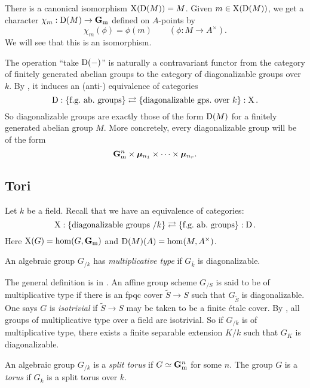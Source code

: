 There is a canonical isomorphism $\operatorname{X}(\operatorname{D}(M))=M$. Given 
$m\in \operatorname{X}(\operatorname{D}(M))$, we get a character $\chi_m:\operatorname{D}(M)\to\mathbf{G}_\mathrm{m}$ 
defined on $A$-points by 
\[
  \chi_m(\phi) = \phi(m) \qquad (\phi:M\to A^\times) .
\]
We will see that this is an isomorphism. 

The operation ``take $\operatorname{D}(-)$'' is naturally a contravariant functor from the 
category of finitely generated abelian groups to the category of diagonalizable 
groups over $k$. By \cite[VIII 1.6]{sga3-ii}, it induces an (anti-) equivalence 
of categories 
\[
  \operatorname{D}:\{\text{f.g.~ab.~groups}\} \rightleftarrows \{\text{diagonalizable gps.~over $k$}\}: \operatorname{X} .
\]
So diagonalizable groups are exactly those of the form 
$\operatorname{D}(M)$ for a finitely generated abelian group $M$. More concretely, every 
diagonalizable group will be of the form 
\[
  \mathbf{G}_\mathrm{m}^n \times \bm{\mu}_{n_1} \times \cdots \times \bm{\mu}_{n_r} .
\]





\subsection{Tori}

Let $k$ be a field. Recall that we have an equivalence of categories: 
\[
  \operatorname{X}:\{\text{diagonalizable groups }/k\} \rightleftarrows \{\text{f.g.~ab.~groups}\}:\operatorname{D} .
\]
Here $\operatorname{X}(G)=\hom(G,\mathbf{G}_\mathrm{m})$ and $\operatorname{D}(M)(A)=\hom(M,A^\times)$. 

\begin{definition}
An algebraic group $G_{/k}$ has \emph{multiplicative type} if $G_{\bar k}$ is 
diagonalizable. 
\end{definition}

\begin{hard}
The general definition is in \cite[IX 1.1]{sga3-iii}. An affine group scheme 
$G_{/S}$ is said to be of multiplicative type if there is an fpqc cover 
$\widetilde S\to S$ such that $G_{\widetilde S}$ is diagonalizable. One says 
$G$ is \emph{isotrivial} if $\widetilde S\to S$ may be taken to be a finite 
\'etale cover. By \cite[X 5.16]{sga3-ii}, all groups of multiplicative type 
over a field are isotrivial. So if $G_{/k}$ is of multiplicative type, there 
exists a finite separable extension $K/k$ such that $G_K$ is diagonalizable. 
\end{hard}

\begin{definition}
An algebraic group $G_{/k}$ is a \emph{split torus} if 
$G\simeq \mathbf{G}_\mathrm{m}^n$ for some $n$. The group $G$ is a \emph{torus} if 
$G_{\bar k}$ is a split torus over $k$. 
\end{definition}

